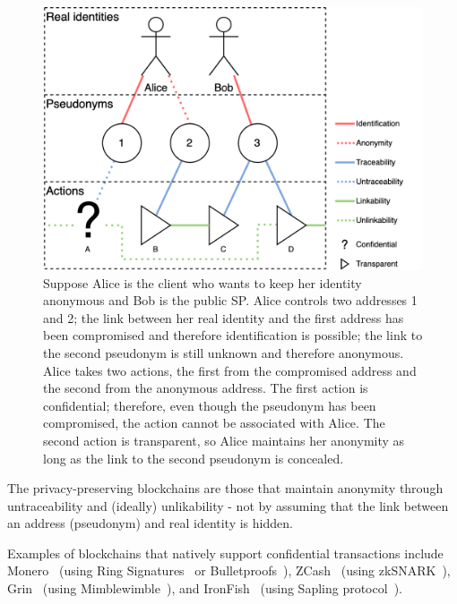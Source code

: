 \documentclass[pdftex,twocolumn,epjc3]{svjour3}
\begin{document}
{\begin{figure}[h!]
\includegraphics[width=\linewidth]{anonymity-diagram.png}
\centering
\caption{Suppose Alice is the client who wants to keep her identity anonymous and Bob is the public SP. Alice controls two addresses 1 and 2; the link between her real identity and the first address has been compromised and therefore identification is possible; the link to the second pseudonym is still unknown and therefore anonymous. Alice takes two actions, the first from the compromised address and the second from the anonymous address. The first action is confidential; therefore, even though the pseudonym has been compromised, the action cannot be associated with Alice. The second action is transparent, so Alice maintains her anonymity as long as the link to the second pseudonym is concealed.}

\label{fig:anonymity-diagram}
\end{figure}
The privacy-preserving blockchains are those that maintain anonymity through untraceability and (ideally) unlikability - not by assuming that the link between an address (pseudonym) and real identity is hidden.   

Examples of blockchains that natively support confidential transactions include Monero~\cite{vansaberhagenCryptoNote2013} (using Ring Signatures~\cite{noetherRingSignatureConfidential2015} or Bulletproofs~\cite{bunzBulletproofsShortProofs2018}), ZCash~\cite{ben-sassonZerocashDecentralizedAnonymous2014} (using zkSNARK~\cite{ben-sassonSNARKsVerifyingProgram2013}), Grin~\cite{fuchsbauerAggregateCashSystems2019} (using Mimblewimble~\cite{jedusorMIMBLEWIMBLE2016}), and IronFish~\cite{ironfishPrivateAnonymousEasy} (using Sapling protocol~\cite{hopwoodZcashSaplingProtocol2022}).

}
\end{document}
